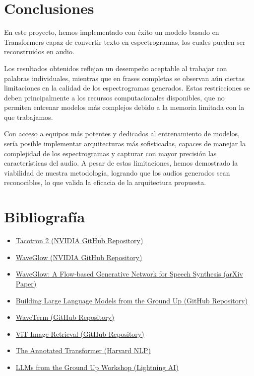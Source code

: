 \documentclass{article}
\begin{document}
\section{\Huge Conclusiones}
\begin{Large}
\vspace{0.5cm}

En este proyecto, hemos implementado con éxito un modelo basado en Transformers capaz de convertir texto en espectrogramas, los cuales pueden ser reconstruidos en audio.

Los resultados obtenidos reflejan un desempeño aceptable al trabajar con palabras individuales, mientras que en frases completas se observan aún ciertas limitaciones en la calidad de los espectrogramas generados. Estas restricciones se deben principalmente a los recursos computacionales disponibles, que no permiten entrenar modelos más complejos debido a la memoria limitada con la que trabajamos.

Con acceso a equipos más potentes y dedicados al entrenamiento de modelos, sería posible implementar arquitecturas más sofisticadas, capaces de manejar la complejidad de los espectrogramas y capturar con mayor precisión las características del audio. A pesar de estas limitaciones, hemos demostrado la viabilidad de nuestra metodología, logrando que los audios generados sean reconocibles, lo que valida la eficacia de la arquitectura propuesta.


\end{Large}
\vspace{2cm}
\section{\Huge Bibliografía}
\vspace{2cm}

\begin{itemize}
    \item \href{https://github.com/NVIDIA/tacotron2?tab=readme-ov-file}{Tacotron 2 (NVIDIA GitHub Repository)}
    \item \href{https://github.com/NVIDIA/waveglow}{WaveGlow (NVIDIA GitHub Repository)}
    \item \href{https://arxiv.org/abs/1811.00002}{WaveGlow: A Flow-based Generative Network for Speech Synthesis (arXiv Paper)}
    \item \href{https://github.com/Maitreyee1/Building-LLM-Ground-Up/tree/main}{Building Large Language Models from the Ground Up (GitHub Repository)}
    \item \href{https://github.com/wavetermdev/waveterm}{WaveTerm (GitHub Repository)}
    \item \href{https://github.com/bnsreenu/vit-image-retrieval}{ViT Image Retrieval (GitHub Repository)}
    \item \href{https://nlp.seas.harvard.edu/annotated-transformer/}{The Annotated Transformer (Harvard NLP)}
    \item \href{https://lightning.ai/lightning-ai/studios/llms-from-the-ground-up-workshop?section=featured}{LLMs from the Ground Up Workshop (Lightning AI)}
\end{itemize}
\end{document}
